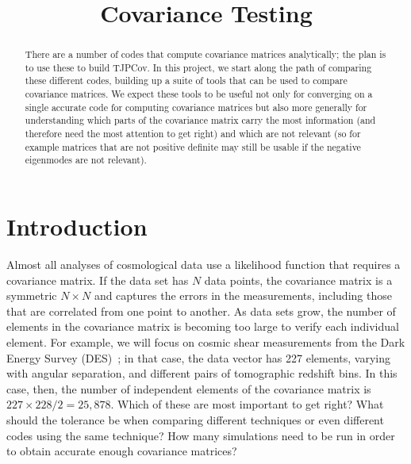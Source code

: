 \documentclass[twocolumn]{\docclass}
\begin{document}
	
	\title{Covariance Testing}
	
	\maketitlepre
	
	\begin{abstract}
		
		There  are a number of codes that compute covariance matrices analytically; the plan is to use these to build TJPCov. In this project, we start along the path of comparing these different codes, building up a suite of tools that can be used to compare covariance matrices. We expect these tools to be useful not only for converging on a single accurate code for computing covariance matrices but also more generally for understanding which parts of the covariance matrix carry the most information (and therefore need the most attention to get right) and which are not relevant (so for example matrices that are not positive definite may still be usable if the negative eigenmodes are not relevant).
	\end{abstract}
	
	\dockeys{}
	
	\maketitlepost
	
	
	\section{Introduction}
	\label{sec:intro}
	
Almost all analyses of cosmological data use a likelihood function that requires a covariance matrix. If the data set has $N$ data points, the covariance matrix is a symmetric $N\times N$ and captures the errors in the measurements, including those that are correlated from one point to another. As data sets grow, the number of elements in the covariance matrix is becoming too large to verify each individual element. For example, we will focus on cosmic shear measurements from the Dark Energy Survey (DES)~\cite{Troxel:2017xyo}; in that case, the data vector has 227 elements, varying with angular separation, and different pairs of tomographic redshift bins. In this case, then, the number of independent elements of the covariance matrix is $227\times 228/2=25,878$. Which of these are most important to get right? What should the tolerance be when comparing different techniques or even different codes using the same technique? How many simulations need to be run in order to obtain accurate enough covariance matrices? 
\end{document}
